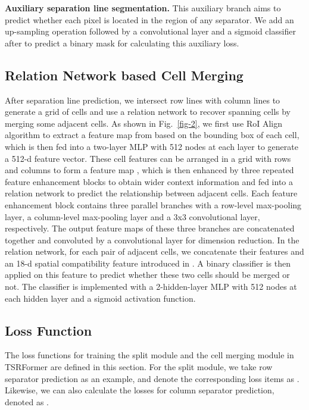 \documentclass[sigconf]{acmart}
\begin{document}
\textbf{Auxiliary separation line segmentation.} This auxiliary branch aims to predict whether each pixel is located in the region of any separator. We add an up-sampling operation followed by a  convolutional layer and a sigmoid classifier after  to predict a binary mask  for calculating this auxiliary loss.


\subsection{Relation Network based Cell Merging}
After separation line prediction, we intersect row lines with column lines to generate a grid of cells and use a relation network \cite{rn2017} to recover spanning cells by merging some adjacent cells. As shown in Fig.~\ref{fig-2}, we first use RoI Align algorithm \cite{maskrcnn2017} to extract a  feature map from  based on the bounding box of each cell, which is then fed into a two-layer MLP with 512 nodes at each layer to generate a 512-d feature vector. These cell features can be arranged in a grid with  rows and  columns to form a feature map , which is then enhanced by three repeated feature enhancement blocks to obtain wider context information and  fed into a relation network to predict the relationship between adjacent cells. Each feature enhancement block contains three parallel branches with a row-level max-pooling layer, a column-level max-pooling layer and a 3x3 convolutional layer, respectively. The output feature maps of these three branches are concatenated together and convoluted by a  convolutional layer for dimension reduction. In the relation network, for each pair of adjacent cells, we concatenate their features and an 18-d spatial compatibility feature introduced in \cite{rn2017}. A binary classifier is then applied on this feature to predict whether these two cells should be merged or not. The classifier is implemented with a 2-hidden-layer MLP with 512 nodes at each hidden layer and a sigmoid activation function.

\subsection{Loss Function}

The loss functions for training the split module and the cell merging module in TSRFormer are defined in this section. For the split module, we take row separator prediction as an example, and denote the corresponding loss items as . Likewise, we can also calculate the losses for column separator prediction, denoted as .
\end{document}
